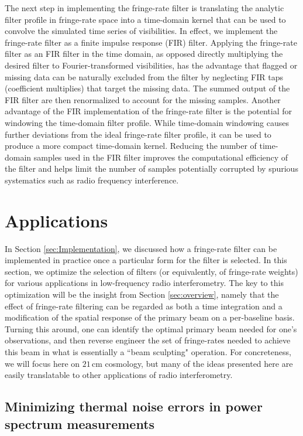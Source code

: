 \documentclass[twocolumn,apj,numberedappendix]{emulateapj}
\begin{document}
The next step in implementing the fringe-rate filter is translating the analytic filter profile in fringe-rate space into 
a time-domain kernel that can be used to convolve the simulated time series of visibilities.  In effect, we implement
the fringe-rate filter as a finite impulse response (FIR) filter.  Applying the fringe-rate filter as an FIR filter in
the time domain, as opposed directly multiplying the desired filter to Fourier-transformed visibilities, has the advantage 
that flagged or missing data can be naturally excluded from the filter by neglecting
FIR taps (coefficient multiplies) that target the missing data. The summed output of the FIR filter are then renormalized to
account for the missing samples.  Another advantage of the FIR implementation of the fringe-rate filter is the potential for
windowing the time-domain filter profile.  While time-domain windowing causes further deviations from the ideal
fringe-rate filter profile, it can be used to produce a more compact time-domain kernel.
Reducing the number of time-domain samples used in the FIR filter improves the computational efficiency of the filter and
helps limit the number of samples potentially corrupted by spurious systematics such as radio frequency interference.


\section{Applications}
\label{sec:bmsculpt}

In Section \ref{sec:Implementation}, we discussed how a fringe-rate filter can be implemented in practice once a particular form for the filter is selected. In this section, we optimize the selection of filters (or equivalently, of fringe-rate weights) for various applications in low-frequency radio interferometry. The key to this optimization will be the insight from Section \ref{sec:overview}, namely that the effect of fringe-rate filtering can be regarded as both a time integration and a modification of the spatial response of the primary beam on a per-baseline basis. Turning this around, one can identify the optimal primary beam needed for one's observations, and then reverse engineer the set of fringe-rates needed to achieve this beam in what is essentially a ``beam sculpting" operation. For concreteness, we will focus here on $21\,\textrm{cm}$ cosmology, but many of the ideas presented here are easily translatable to other applications of radio interferometry.

\subsection{Minimizing thermal noise errors in power spectrum measurements}
\label{sec:PspecOptimization}
\end{document}
